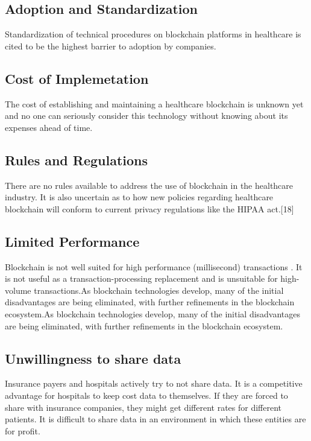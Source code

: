 \documentclass[12pt]{report}
\begin{document}
\subsection{Adoption and Standardization}
Standardization of technical procedures on blockchain platforms in healthcare is cited to be the highest barrier to adoption by companies.
\subsection{Cost of Implemetation}
The cost of establishing and maintaining a healthcare blockchain is unknown yet and no one can seriously consider this technology without knowing about its expenses ahead of time.
\subsection{Rules and Regulations}
There are no rules available to address the use of blockchain in the healthcare industry. It is also uncertain as to how new policies regarding healthcare blockchain will conform to current privacy regulations like the HIPAA act.[18]

\subsection{Limited Performance \cite{3}}
Blockchain is not well suited for high performance (millisecond) transactions . It is not useful as a transaction-processing
replacement and is unsuitable for  high-volume transactions.As blockchain technologies develop, many of the initial disadvantages are being eliminated, with further
refinements in the blockchain ecosystem.As blockchain technologies develop, many of the initial disadvantages are being eliminated, with further
refinements in the blockchain ecosystem.
\subsection{Unwillingness to share data}
Insurance payers and hospitals actively try to not share data. It is a competitive advantage for hospitals to keep cost data to themselves. If they are forced to share with insurance companies, they might get different rates for different patients. It is difficult to share data in an environment in which these entities are for profit.
\end{document}
